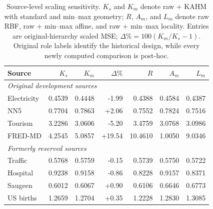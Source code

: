 \begin{table}[t]
\centering
\scriptsize
\begin{tabular}{lrrrrrr}
\toprule
Source & $K_s$ & $K_m$ & $\Delta\%$ & $R$ & $A_m$ & $L_m$ \\
\midrule
\multicolumn{7}{l}{\emph{Original development sources}} \\
Electricity & 0.4539 & 0.4448 & -1.99 & 0.4388 & 0.4584 & 0.4387 \\
NN5 & 0.7704 & 0.7863 & +2.06 & 0.7552 & 0.7824 & 0.7516 \\
Tourism & 3.2286 & 3.0606 & -5.20 & 3.4759 & 3.0768 & 3.0986 \\
FRED-MD & 4.2545 & 5.0857 & +19.54 & 10.4610 & 1.0050 & 9.0346 \\
\midrule
\multicolumn{7}{l}{\emph{Formerly reserved sources}} \\
Traffic & 0.5768 & 0.5759 & -0.15 & 0.5739 & 0.5750 & 0.5722 \\
Hospital & 0.9238 & 0.9158 & -0.86 & 0.8228 & 0.9157 & 0.8371 \\
Saugeen & 0.6012 & 0.6067 & +0.90 & 0.6106 & 0.6646 & 0.6773 \\
US births & 1.2659 & 1.2704 & +0.35 & 1.2228 & 1.2830 & 1.3085 \\
\bottomrule
\end{tabular}
\caption{Source-level scaling sensitivity. $K_s$ and $K_m$ denote raw + KAHM with standard and min--max geometry; $R$, $A_m$, and $L_m$ denote raw RBF, raw + min--max affine, and raw + min--max locality. Entries are original-hierarchy scaled MSE; $\Delta\% = 100(K_m/K_s-1)$. Original role labels identify the historical design, while every newly computed comparison is post-hoc.}
\label{tab:scaling-sources}
\end{table}
